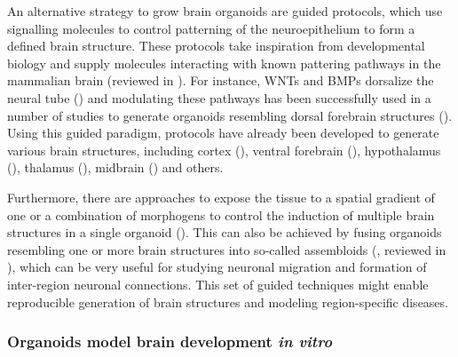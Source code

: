 An alternative strategy to grow brain organoids are guided protocols, which use signalling molecules to control patterning of the neuroepithelium to form a defined brain structure. These protocols take inspiration from  developmental biology and supply molecules interacting with known pattering pathways in the mammalian brain (reviewed in \cite{chiaradia_brain_2020}). For instance, WNTs and BMPs dorsalize the neural tube (\cite{dickinson_dorsalization_1995,saint-jeannet_regulation_1997}) and modulating these pathways has been successfully used in a number of studies to generate organoids resembling dorsal forebrain structures (\cite{xiang_fusion_2017,pasca_functional_2015,qian_brain-region-specific_2016,qian_sliced_2020}). Using this guided paradigm, protocols have already been developed to generate various brain structures, including cortex (\cite{eiraku_self-organizing_2011,kadoshima_self-organization_2013,pasca_functional_2015,velasco_individual_2019}), ventral forebrain (\cite{miura_generation_2020,birey_assembly_2017,xiang_fusion_2017,bagley_fused_2017}), hypothalamus (\cite{qian_brain-region-specific_2016}), thalamus (\cite{xiang_hesc-derived_2019}), midbrain (\cite{qian_brain-region-specific_2016,monzel_derivation_2017,kim_modeling_2019}) and others. 

Furthermore, there are approaches to expose the tissue to a spatial gradient of one or a combination of morphogens to control the induction of multiple brain structures in a single organoid (\cite{rifes_modeling_2020,cederquist_specification_2019}). This can also be achieved by fusing organoids resembling one or more brain structures into so-called assembloids (\cite{bagley_fused_2017,birey_assembly_2017,xiang_fusion_2017}, reviewed in \cite{pasca_rise_2018}), which can be very useful for studying neuronal migration and formation of inter-region neuronal connections. This set of guided techniques might enable reproducible generation of brain structures and modeling region-specific diseases.



\subsubsection{Organoids model brain development \textit{in vitro}}

